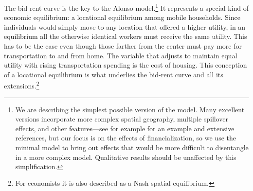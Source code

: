  The \gls{bid-rent curve} is the key to the Alonso model.\footnote{We are describing the simplest possible version of the model. Many excellent versions incorporate more complex spatial geography, multiple spillover effects, and other features---see for example \cite{ahlfeldtEconomicsDensityEvidence2015} for an example and extensive references, but our focus is on the effects of financialization, so we use the minimal model to bring out effects that would be more difficult to disentangle in a more complex model. Qualitative results should be unaffected by this simplification.}  It represents a special kind of economic equilibrium:   a locational equilibrium among mobile households. Since individuals would simply move to any location that offered a higher utility, in an equilibrium all the otherwise identical workers must receive the same utility. This has to be the case even though those farther from the center must pay more for transportation to and from home. The variable that adjusts to maintain equal utility with rising transportation spending is the cost of housing. This conception of a \gls{locational equilibrium} is what underlies the bid-rent curve and all its extensions.\footnote{For economists it is also described as a Nash spatial equilibrium.}








